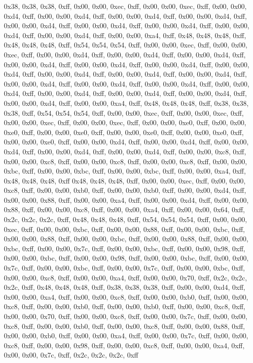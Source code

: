 0x38, 0x38, 0x38, 0xff, 0x00, 0x00, 0xec, 0xff, 0x00, 0x00, 0xec, 0xff, 0x00, 0x00, 0xd4, 0xff, 0x00, 0x00, 0xd4, 0xff, 0x00, 0x00, 0xd4, 0xff, 0x00, 0x00, 0xd4, 0xff, 0x00, 0x00, 0xd4, 0xff, 0x00, 0x00, 0xd4, 0xff, 0x00, 0x00, 0xd4, 0xff, 0x00, 0x00, 0xd4, 0xff, 0x00, 0x00, 0xd4, 0xff, 0x00, 0x00, 0xa4, 0xff, 0x48, 0x48, 0x48, 0xff, 0x48, 0x48, 0x48, 0xff, 0x54, 0x54, 0x54, 0xff, 0x00, 0x00, 0xec, 0xff, 0x00, 0x00, 0xec, 0xff, 0x00, 0x00, 0xd4, 0xff, 0x00, 0x00, 0xd4, 0xff, 0x00, 0x00, 0xd4, 0xff, 0x00, 0x00, 0xd4, 0xff, 0x00, 0x00, 0xd4, 0xff, 0x00, 0x00, 0xd4, 0xff, 0x00, 0x00, 0xd4, 0xff, 0x00, 0x00, 0xd4, 0xff, 0x00, 0x00, 0xd4, 0xff, 0x00, 0x00, 0xd4, 0xff, 0x00, 0x00, 0xd4, 0xff, 0x00, 0x00, 0xd4, 0xff, 0x00, 0x00, 0xd4, 0xff, 0x00, 0x00, 0xd4, 0xff, 0x00, 0x00, 0xd4, 0xff, 0x00, 0x00, 0xd4, 0xff, 0x00, 0x00, 0xd4, 0xff, 0x00, 0x00, 0xd4, 0xff, 0x00, 0x00, 0xa4, 0xff, 0x48, 0x48, 0x48, 0xff, 0x38, 0x38, 0x38, 0xff, 0x54, 0x54, 0x54, 0xff, 0x00, 0x00, 0xec, 0xff, 0x00, 0x00, 0xec, 0xff, 0x00, 0x00, 0xec, 0xff, 0x00, 0x00, 0xec, 0xff, 0x00, 0x00, 0xe0, 0xff, 0x00, 0x00, 0xe0, 0xff, 0x00, 0x00, 0xe0, 0xff, 0x00, 0x00, 0xe0, 0xff, 0x00, 0x00, 0xe0, 0xff, 0x00, 0x00, 0xe0, 0xff, 0x00, 0x00, 0xd4, 0xff, 0x00, 0x00, 0xd4, 0xff, 0x00, 0x00, 0xd4, 0xff, 0x00, 0x00, 0xd4, 0xff, 0x00, 0x00, 0xd4, 0xff, 0x00, 0x00, 0xc8, 0xff, 0x00, 0x00, 0xc8, 0xff, 0x00, 0x00, 0xc8, 0xff, 0x00, 0x00, 0xc8, 0xff, 0x00, 0x00, 0xbc, 0xff, 0x00, 0x00, 0xbc, 0xff, 0x00, 0x00, 0xbc, 0xff, 0x00, 0x00, 0xa4, 0xff, 0x48, 0x48, 0x48, 0xff
0x48, 0x48, 0x48, 0xff, 0x00, 0x00, 0xec, 0xff, 0x00, 0x00, 0xc8, 0xff, 0x00, 0x00, 0xb0, 0xff, 0x00, 0x00, 0xb0, 0xff, 0x00, 0x00, 0xd4, 0xff, 0x00, 0x00, 0x88, 0xff, 0x00, 0x00, 0xa4, 0xff, 0x00, 0x00, 0xd4, 0xff, 0x00, 0x00, 0x88, 0xff, 0x00, 0x00, 0xc8, 0xff, 0x00, 0x00, 0xa4, 0xff, 0x00, 0x00, 0x64, 0xff, 0x2c, 0x2c, 0x2c, 0xff, 0x48, 0x48, 0x48, 0xff, 0x54, 0x54, 0x54, 0xff, 0x00, 0x00, 0xec, 0xff, 0x00, 0x00, 0xbc, 0xff, 0x00, 0x00, 0x88, 0xff, 0x00, 0x00, 0xbc, 0xff, 0x00, 0x00, 0x88, 0xff, 0x00, 0x00, 0xbc, 0xff, 0x00, 0x00, 0x88, 0xff, 0x00, 0x00, 0xbc, 0xff, 0x00, 0x00, 0x7c, 0xff, 0x00, 0x00, 0xbc, 0xff, 0x00, 0x00, 0x98, 0xff, 0x00, 0x00, 0xbc, 0xff, 0x00, 0x00, 0x98, 0xff, 0x00, 0x00, 0xbc, 0xff, 0x00, 0x00, 0x7c, 0xff, 0x00, 0x00, 0xbc, 0xff, 0x00, 0x00, 0x7c, 0xff, 0x00, 0x00, 0xbc, 0xff, 0x00, 0x00, 0xc8, 0xff, 0x00, 0x00, 0xa4, 0xff, 0x00, 0x00, 0x70, 0xff, 0x2c, 0x2c, 0x2c, 0xff, 0x48, 0x48, 0x48, 0xff, 0x38, 0x38, 0x38, 0xff, 0x00, 0x00, 0xd4, 0xff, 0x00, 0x00, 0xa4, 0xff, 0x00, 0x00, 0xc8, 0xff, 0x00, 0x00, 0xb0, 0xff, 0x00, 0x00, 0xc8, 0xff, 0x00, 0x00, 0xb0, 0xff, 0x00, 0x00, 0xb0, 0xff, 0x00, 0x00, 0xc8, 0xff, 0x00, 0x00, 0x70, 0xff, 0x00, 0x00, 0xc8, 0xff, 0x00, 0x00, 0x7c, 0xff, 0x00, 0x00, 0xc8, 0xff, 0x00, 0x00, 0xb0, 0xff, 0x00, 0x00, 0xc8, 0xff, 0x00, 0x00, 0x88, 0xff, 0x00, 0x00, 0xb0, 0xff, 0x00, 0x00, 0xa4, 0xff, 0x00, 0x00, 0x7c, 0xff, 0x00, 0x00, 0xc8, 0xff, 0x00, 0x00, 0x98, 0xff, 0x00, 0x00, 0xc8, 0xff, 0x00, 0x00, 0xa4, 0xff, 0x00, 0x00, 0x7c, 0xff, 0x2c, 0x2c, 0x2c, 0xff
